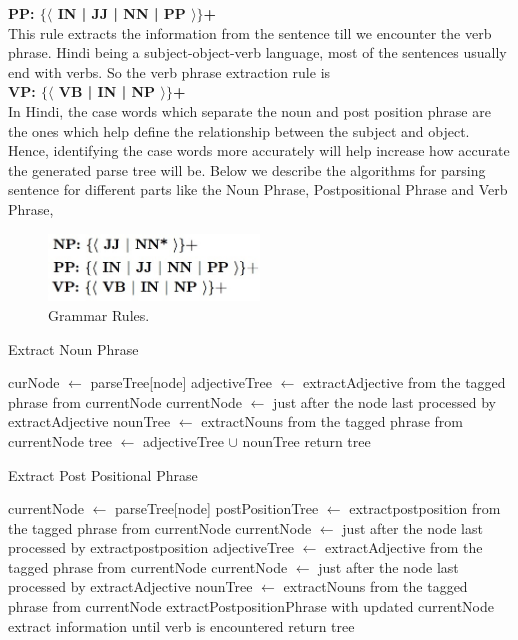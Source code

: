 \textbf {PP: $\{ \langle$ IN | JJ | NN | PP $\rangle \}$+} \\

This rule extracts the information from the sentence till we encounter the verb phrase. Hindi being a subject-object-verb language, most of the sentences usually end with verbs. So the verb phrase extraction rule is \\

\textbf {VP: $\{ \langle$ VB | IN | NP $\rangle \}$+} \\

In Hindi, the case words which separate the noun and post position phrase are the ones which help define the relationship between the subject and object. Hence, identifying the case words more accurately will help increase how accurate the generated parse tree will be. Below we describe the algorithms for parsing sentence for different parts like the Noun Phrase, Postpositional Phrase and Verb Phrase,

\begin{figure}[htb]
\centering
\includegraphics[width=0.5\textwidth]{images/gammarrules.jpg}
\caption{Grammar Rules.} 
\label{fig:gammarrules}
\end{figure}

\begin {algorithm}
\caption {Extract Noun Phrase}
\begin {algorithmic}[1]
\State curNode $\gets$ parseTree[node]
\State adjectiveTree $\gets$ extractAdjective from the tagged phrase from currentNode
\State currentNode $\gets$ just after the node last processed by extractAdjective
\State nounTree $\gets$ extractNouns from the tagged phrase from currentNode
\State tree $\gets$ adjectiveTree $\cup$ nounTree 
\State return tree
\EndProcedure		
\end {algorithmic}
\end {algorithm}

\begin {algorithm}
\caption {Extract Post Positional Phrase}
\begin {algorithmic}[1]
\State currentNode $\gets$ parseTree[node]
 \State postPositionTree $\gets$ extractpostposition from the tagged phrase from currentNode
\State currentNode $\gets$ just after the node last processed by extractpostposition
\State adjectiveTree $\gets$ extractAdjective from the tagged phrase from currentNode
\State currentNode $\gets$ just after the node last processed by extractAdjective
\State nounTree $\gets$ extractNouns from the tagged phrase from currentNode
\State extractPostpositionPhrase with updated currentNode extract information until verb is encountered
\EndIf
\State return tree
\EndProcedure		
\end {algorithmic}
\end {algorithm}

